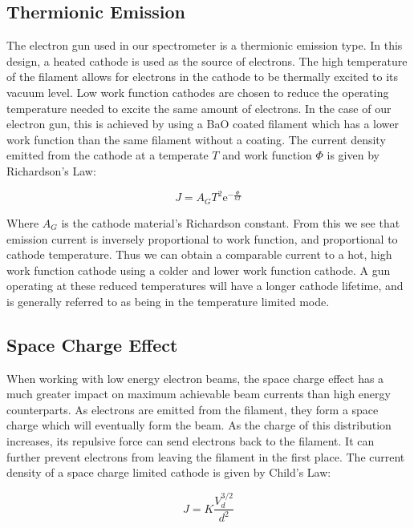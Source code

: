 \subsection{Thermionic Emission}

The electron gun used in our spectrometer is a thermionic emission type. In this design, a heated cathode is used as the source of electrons. The 
high temperature of the filament allows for electrons in the cathode to be thermally excited to its vacuum level. Low work function cathodes 
are chosen to reduce the operating temperature needed to excite the same amount of electrons. In the case of our electron gun, this is achieved by 
using a BaO coated filament which has a lower work function than the same filament without a coating\cite{kimballphysics}. The current density 
emitted from the cathode at a temperate $T$ and work function $\Phi$ is given by Richardson's Law:

\begin{equation}\label{richardson}
  J = A_G T^2 \mathrm{e}^{-\frac{\Phi}{kT}}
\end{equation}

Where $A_G$ is the cathode material's Richardson constant. From this we see that emission current is inversely proportional to work function, and 
proportional to cathode temperature. Thus we can obtain a comparable current to a hot, high work function cathode using a colder and lower work function 
cathode. A gun operating at these reduced temperatures will have a longer cathode lifetime, and is generally referred to as being in the temperature limited 
mode.

\subsection{Space Charge Effect}

When working with low energy electron beams, the space charge effect has a much greater impact on maximum achievable beam currents than 
high energy counterparts\cite{staib,stoffel1985low,raj2004optimization}.
As electrons are emitted from the filament, they form a space charge which will eventually form the beam. As the charge of this distribution increases, 
its repulsive force can send electrons back to the filament. It can further prevent electrons from leaving the filament in the first place. The current 
density of a space charge limited cathode is given by Child's Law:

\begin{equation}
  J = K \frac{V_d^{3/2}}{d^2}
\end{equation}

